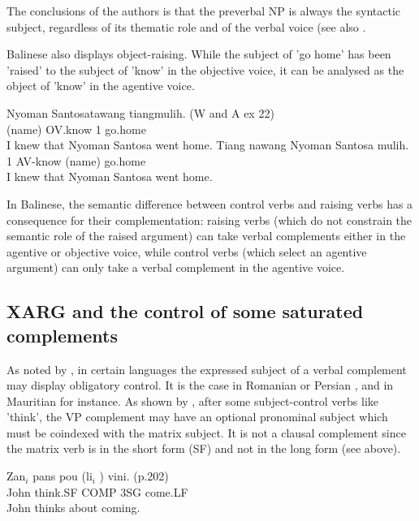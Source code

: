\documentclass[output=paper]{langsci/langscibook}
\begin{document}
The conclusions of the authors is that the preverbal NP is always the syntactic subject, regardless of its thematic role and of the verbal voice (see also \citealt{ManningandSag1998}.

Balinese also displays object-raising. While the subject of 'go home' has been 'raised' to the subject of 'know' in the objective voice, it can be analysed as the object of 'know' in the agentive voice.

\begin{exe}
\ex \begin{xlist}
\ex \gll Nyoman Santosatawang tiangmulih. (W and A ex 22)\\
(name) OV.know 1 go.home\\
\glt I knew that Nyoman Santosa went home.
\ex \gll Tiang nawang Nyoman Santosa mulih.\\
1 AV-know (name) go.home\\
\glt I knew that Nyoman Santosa went home.
\end{xlist}
\end{exe}

In Balinese, the semantic difference between control verbs and raising verbs has a consequence for their complementation: raising verbs (which do not constrain the semantic role of the raised argument) can take verbal complements either in the agentive or objective voice, while control verbs (which select an agentive argument) can only take a verbal complement in the agentive voice.

\subsection{XARG and the control of some saturated complements}

As noted by \citet{Farkas1988}, in certain languages the expressed subject of a verbal complement may display obligatory control. It is the case in Romanian or Persian \citet{Karimi2008}, and in Mauritian for instance. As shown by \citet{HenriandLaurens2011}, after some subject-control verbs like 'think', the VP complement may have an optional pronominal subject which must be coindexed with the matrix subject. It is not a clausal complement since the matrix verb is in the short form (SF) and not in the long form (see above).

\begin{exe}
\ex \gll Zan$_{i}$ pans pou (li$_{i}$ ) vini. (p.202)\\
John think.SF COMP 3SG come.LF  \\
 \glt John thinks about coming.
\end{exe}
\end{document}
